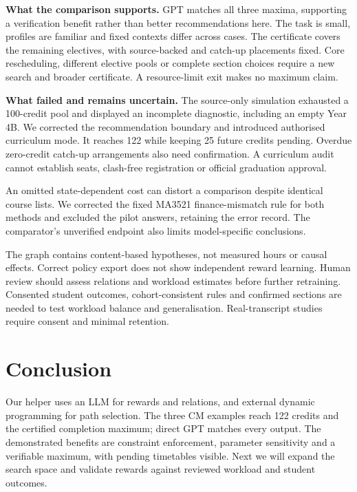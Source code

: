 \documentclass{article}
\begin{document}
\textbf{What the comparison supports.} GPT matches all three maxima, supporting a verification benefit rather than better recommendations here. The task is small, profiles are familiar and fixed contexts differ across cases. The certificate covers the remaining electives, with source-backed and catch-up placements fixed. Core rescheduling, different elective pools or complete section choices require a new search and broader certificate. A resource-limit exit makes no maximum claim.

\textbf{What failed and remains uncertain.} The source-only simulation exhausted a 100-credit pool and displayed an incomplete diagnostic, including an empty Year 4B. We corrected the recommendation boundary and introduced authorised curriculum mode. It reaches 122 while keeping 25 future credits pending. Overdue zero-credit catch-up arrangements also need confirmation. A curriculum audit cannot establish seats, clash-free registration or official graduation approval.

An omitted state-dependent cost can distort a comparison despite identical course lists. We corrected the fixed MA3521 finance-mismatch rule for both methods and excluded the pilot answers, retaining the error record. The comparator's unverified endpoint also limits model-specific conclusions.

The graph contains content-based hypotheses, not measured hours or causal effects. Correct policy export does not show independent reward learning. Human review should assess relations and workload estimates before further retraining. Consented student outcomes, cohort-consistent rules and confirmed sections are needed to test workload balance and generalisation. Real-transcript studies require consent and minimal retention.

\section{Conclusion}
Our helper uses an LLM for rewards and relations, and external dynamic programming for path selection. The three CM examples reach 122 credits and the certified completion maximum; direct GPT matches every output. The demonstrated benefits are constraint enforcement, parameter sensitivity and a verifiable maximum, with pending timetables visible. Next we will expand the search space and validate rewards against reviewed workload and student outcomes.
\end{document}
